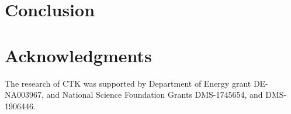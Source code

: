 \documentclass{nseJournal}
\begin{document}




\clearpage


\section{Conclusion}
\label{sec:conclusion}


\pagebreak
\section*{Acknowledgments}

The research of CTK was supported by 
Department of Energy grant DE-NA003967,
%
and National Science Foundation Grants
DMS-1745654,
and
DMS-1906446.


\pagebreak

\end{document}

